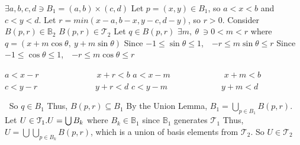 \documentclass[12pt]{article}
\begin{document}
	\(\exists a,b,c,d \ni B_1 = (a,b) \times (c,d)\)
	\newline
	Let \(p = (x,y) \in B_1\), so \(a<x<b\) and \(c<y<d\).
	\newline
	Let \(r=min(x-a,b-x,y-c,d-y)\), so \(r > 0\).
	\newline \newline
	Consider \(B(p,r) \in \mathbb{B}_2\)
	\newline
	\(B(p,r)\in \mathcal{T}_2\)
	\newline
	Let \(q \in B(p,r)\) \newline
	\(\exists m,\ \theta\  \ni 0< m <r\) where \(q=(x+m\cos \theta,\  y+m\sin \theta)\)
	\newline
	Since \(-1 \leq \sin\theta \leq 1\),\ \ \(-r \leq m \sin\theta \leq r\)
	\newline
	Since \(-1 \leq \cos\theta \leq 1\),\ \ \(-r \leq m \cos\theta \leq r\)
	\newline
	\begin{adjustwidth}{2cm}{0cm}
		\begin{flushleft}
			\(a < x-r\)\ \ \ \ \ \ \ \ \ \ \ \ \ \ \(x+r<b\) \newline
			\(a<x-m\)\ \ \ \ \ \ \ \ \ \ \ \ \ \(x+m<b\) \newline
			\ \ \ \ \ \  \newline
			\newline
			\(c < y-r\)\ \ \ \ \ \ \ \ \ \ \ \ \ \ \(y+r<d\) \newline
			\(c<y-m\)\ \ \ \ \ \ \ \ \ \ \ \ \ \(y+m<d\) \newline
			\ \ \ \ \ \ 
	\end{flushleft}
	\end{adjustwidth}
	\(\ \)
	\newline
	So \(q \in B_1\) \newline
	Thus, \(B(p,r) \subseteq B_1\) \newline
	By the Union Lemma, \(B_1 = \bigcup_{p \in B_1}B(p,r)\). \newline \newline
	Let \(U \in \mathcal{T}_1.
	\newline
	U = \bigcup B_k\) where \(B_k\in
	\mathbb{B}_1\) since \(\mathbb{B}_1\) generates \(\mathcal{T}_1\)
	\newline
	Thus, \(U = \bigcup\bigcup_{p \in B_k}B(p,r)\), which is a union of basis elements from \(\mathcal{T}_2\). \newline
	So \(U \in \mathcal{T}_2\)
\end{document}
